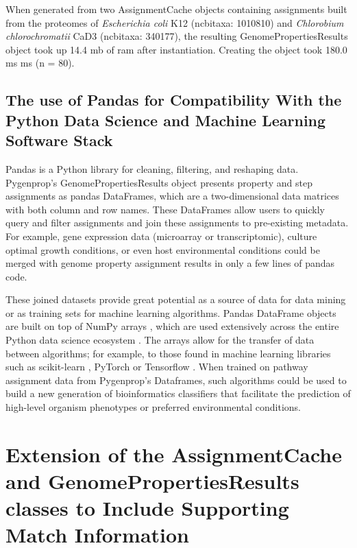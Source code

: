 When generated from two AssignmentCache objects containing assignments built 
from the proteomes of \textit{Escherichia coli} K12 (\gls{ncbitaxa}: 1010810) 
and \textit{Chlorobium chlorochromatii} CaD3 (\gls{ncbitaxa}: 340177), the 
resulting GenomePropertiesResults object took up 14.4 \gls{mb} of \gls{ram} 
after instantiation. Creating the object took 180.0 ms  ms (\gls{n} = 80). 

\subsection{The use of Pandas for Compatibility With the Python Data Science and 
Machine Learning Software Stack}

Pandas is a Python library for cleaning, filtering, and reshaping data. 
Pygenprop's GenomePropertiesResults object presents property and step 
assignments as pandas DataFrames, which are a two-dimensional data matrices with 
both column and row names. These DataFrames allow users to quickly query and 
filter assignments and join these assignments to pre-existing metadata. For 
example, gene expression data (microarray or transcriptomic), culture optimal 
growth conditions, or even host environmental conditions could be merged with 
genome property assignment results in only a few lines of pandas code.

These joined datasets provide great potential as a source of data for data 
mining or as training sets for machine learning algorithms. Pandas DataFrame 
objects are built on top of NumPy arrays \cite{mckinney2010data}, which are used 
extensively across the entire Python data science ecosystem \cite{scipystack}. 
The arrays allow for the transfer of data between algorithms; for example, to 
those found in machine learning libraries such as \gls{scikit}-learn 
\cite{pedregosa2011scikit}, PyTorch \cite{Paszke2017} or Tensorflow 
\cite{abadi2016tensorflow}.  When trained on pathway assignment data from 
Pygenprop's Dataframes, such algorithms could be used to build a new generation 
of bioinformatics classifiers that facilitate the prediction of high-level 
organism phenotypes or preferred environmental conditions.

\section{Extension of the AssignmentCache and GenomePropertiesResults classes to 
Include Supporting Match Information}

